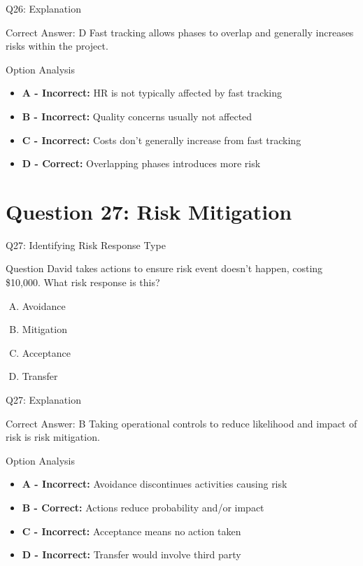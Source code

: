 \documentclass{beamer}
\begin{document}
	\begin{frame}{Q26: Explanation}
		\begin{block}{Correct Answer: D}
			Fast tracking allows phases to overlap and generally increases risks within the project.
		\end{block}
		\begin{block}{Option Analysis}
			\begin{itemize}
				\item \textbf{A - Incorrect:} HR is not typically affected by fast tracking
				\item \textbf{B - Incorrect:} Quality concerns usually not affected
				\item \textbf{C - Incorrect:} Costs don't generally increase from fast tracking
				\item \textbf{D - Correct:} Overlapping phases introduces more risk
			\end{itemize}
		\end{block}
	\end{frame}
	
	\section{Question 27: Risk Mitigation}
	
	\begin{frame}{Q27: Identifying Risk Response Type}
		\begin{block}{Question}
			David takes actions to ensure risk event doesn't happen, costing \$10,000. What risk response is this?
		\end{block}
		\begin{enumerate}[(A)]
			\item Avoidance
			\item Mitigation
			\item Acceptance
			\item Transfer
		\end{enumerate}
	\end{frame}
	
	\begin{frame}{Q27: Explanation}
		\begin{block}{Correct Answer: B}
			Taking operational controls to reduce likelihood and impact of risk is risk mitigation.
		\end{block}
		\begin{block}{Option Analysis}
			\begin{itemize}
				\item \textbf{A - Incorrect:} Avoidance discontinues activities causing risk
				\item \textbf{B - Correct:} Actions reduce probability and/or impact
				\item \textbf{C - Incorrect:} Acceptance means no action taken
				\item \textbf{D - Incorrect:} Transfer would involve third party
			\end{itemize}
		\end{block}
	\end{frame}
	
\end{document}
